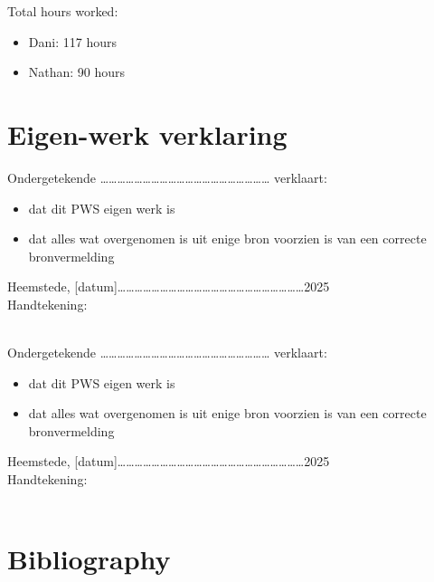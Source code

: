 \documentclass[a4paper,12pt,titlepage]{article}
\begin{document}
Total hours worked:
\begin{itemize}
	\item{Dani: 117 hours}
	\item{Nathan: 90 hours}
\end{itemize}

\pagebreak
\section{Eigen-werk verklaring}
\vspace{3cm}
Ondergetekende …………………………………………………… verklaart:

\begin{itemize}
	\item{dat dit PWS eigen werk is}
	\item{dat alles wat overgenomen is uit enige bron voorzien is van een correcte bronvermelding}
\end{itemize}

Heemstede, [datum]…………………………………………………………2025 \\

Handtekening: \\ \\
\vspace{3cm}

Ondergetekende …………………………………………………… verklaart:

\begin{itemize}
	\item{dat dit PWS eigen werk is}
	\item{dat alles wat overgenomen is uit enige bron voorzien is van een correcte bronvermelding}
\end{itemize}

Heemstede, [datum]…………………………………………………………2025 \\

Handtekening: \\ \\

\pagebreak
\section{Bibliography}
\nocite{*}
\printbibliography
\end{document}
